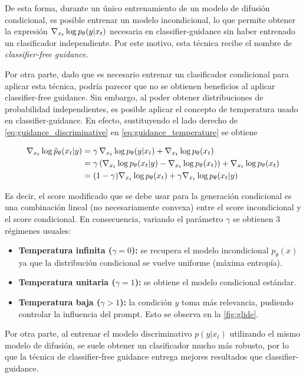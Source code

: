 De esta forma, durante un único entrenamiento de un modelo de difusión condicional, es posible entrenar un modelo incondicional, lo que permite obtener la expresión $\nabla_{x_t} \log p_\theta(y|x_t)$ necesaria en classifier-guidance sin haber entrenado un clasificador independiente. Por este motivo, esta técnica recibe el nombre de \textit{classifier-free guidance}.

Por otra parte, dado que es necesario entrenar un clasificador condicional para aplicar esta técnica, podría parecer que no se obtienen beneficios al aplicar classifier-free guidance. Sin embargo, al poder obtener distribuciones de probabilidad independientes, es posible aplicar el concepto de temperatura usado en classifier-guidance. En efecto, sustituyendo el lado derecho de \eqref{eq:guidance_discriminative} en \eqref{eq:guidance_temperature} se obtiene

\begin{align*}
    \nabla_{x_t} \log \tilde{p}_\theta(x_t|y) &= \gamma\,\nabla_{x_t} \log p_\theta(y|x_t) + \nabla_{x_t} \log p_\theta(x_t)\\
    &= \gamma\left(\nabla_{x_t} \log p_\theta(x_t|y) - \nabla_{x_t} \log p_\theta(x_t)\right)+ \nabla_{x_t} \log p_\theta(x_t)\\
    &= (1-\gamma) \nabla_{x_t} \log p_\theta(x_t) + \gamma\nabla_{x_t} \log p_\theta(x_t|y)
\end{align*}

Es decir, el score modificado que se debe usar para la generación condicional es una combinación lineal (no necesariamente convexa) entre el score incondicional y el score condicional. En consecuencia, variando el parámetro $\gamma$ se obtienen 3 régimenes usuales:

\begin{itemize}
    \item \textbf{Temperatura infinita ($\gamma=0$):} se recupera el modelo incondicional $p_\theta(x)$ ya que la distribución condicional se vuelve uniforme (máxima entropía).
    \item \textbf{Temperatura unitaria ($\gamma=1$):} se obtiene el modelo condicional estándar.
    \item \textbf{Temperatura baja ($\gamma>1$):} la condición $y$ toma más relevancia, pudiendo controlar la influencia del prompt. Esto se observa en la \autoref{fig:glide}.
\end{itemize}

Por otra parte, al entrenar el modelo discriminativo $p(y|x_t)$ utilizando el mismo modelo de difusión, se suele obtener un clasificador mucho más robusto, por lo que la técnica de classifier-free guidance entrega mejores resultados que classifier-guidance.

